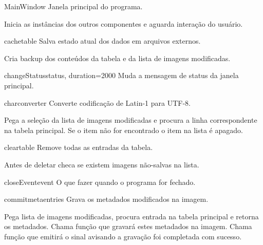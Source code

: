 \documentclass[letterpaper,10pt,portuguese]{manual}
\begin{document}
\hypertarget{veliger.MainWindow}{}\begin{classdesc}{MainWindow}{}
Janela principal do programa.

Inicia as instâncias dos outros componentes e aguarda interação do usuário.

\hypertarget{veliger.MainWindow.cachetable}{}\begin{methoddesc}{cachetable}{}
Salva estado atual dos dados em arquivos externos.

Cria backup dos conteúdos da tabela e da lista de imagens modificadas.
\end{methoddesc}

\hypertarget{veliger.MainWindow.changeStatus}{}\begin{methoddesc}{changeStatus}{status, duration=2000}
Muda a mensagem de status da janela principal.
\end{methoddesc}

\hypertarget{veliger.MainWindow.charconverter}{}\begin{methoddesc}{charconverter}{}
Converte codificação de Latin-1 para UTF-8.

Pega a seleção da lista de imagens modificadas e procura a linha
correspondente na tabela principal. Se o item não for encontrado o item
na lista é apagado.
\end{methoddesc}

\hypertarget{veliger.MainWindow.cleartable}{}\begin{methoddesc}{cleartable}{}
Remove todas as entradas da tabela.

Antes de deletar checa se existem imagens não-salvas na lista.
\end{methoddesc}

\hypertarget{veliger.MainWindow.closeEvent}{}\begin{methoddesc}{closeEvent}{event}
O que fazer quando o programa for fechado.
\end{methoddesc}

\hypertarget{veliger.MainWindow.commitmeta}{}\begin{methoddesc}{commitmeta}{entries}
Grava os metadados modificados na imagem.

Pega lista de imagens modificadas, procura entrada na tabela principal
e retorna os metadados. Chama função que gravará estes metadados na
imagem. Chama função que emitirá o sinal avisando a gravação foi
completada com sucesso.
\end{methoddesc}


\end{classdesc}
\end{document}
